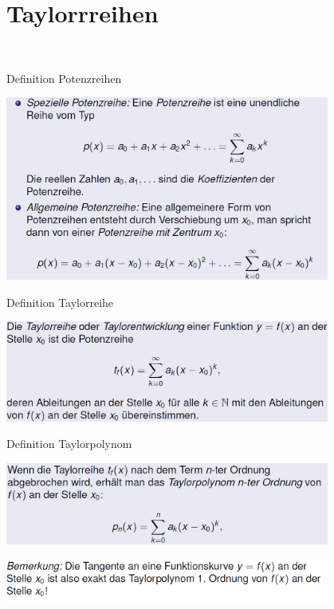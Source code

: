\section{Taylorrreihen}\\
\begin{definition}{Definition Potenzreihen}\\
  \begin{centering}
  \includegraphics[width=0.8\textwidth]{images/2024-06-02-19-11-36.png}\\
  \end{centering}
\end{definition}
\begin{definition}{Definition Taylorreihe}\\
  \begin{centering}
  \includegraphics[width=0.8\textwidth]{images/2024-06-02-19-14-52.png}\\
  \end{centering}
\end{definition}
\begin{definition}{Definition Taylorpolynom}\\
  \begin{centering}
  \includegraphics[width=0.8\textwidth]{images/2024-06-02-19-16-13.png}\\
  \end{centering}
  \begin{centering}
  \includegraphics[width=0.8\textwidth]{images/2024-06-02-19-16-27.png}\\
  \end{centering}
\end{definition}
